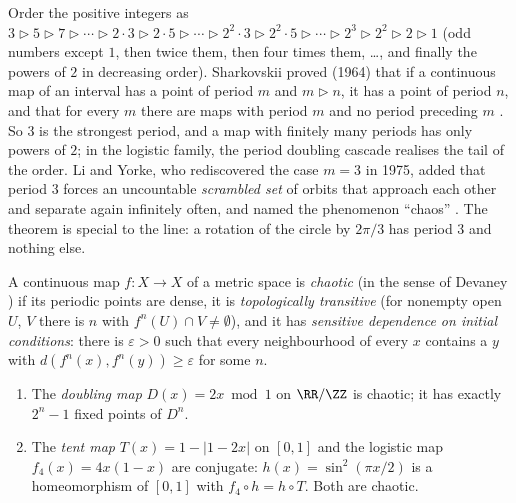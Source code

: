 \begin{remark}\label{ordinary-differential-equations:remark-sharkovskii}
Order the positive integers as $3 \rhd 5 \rhd 7 \rhd \cdots \rhd 2\cdot3 \rhd 2\cdot5 \rhd \cdots \rhd 2^2\cdot3 \rhd 2^2\cdot5 \rhd \cdots \rhd 2^3 \rhd 2^2 \rhd 2 \rhd 1$ (odd numbers except $1$, then twice them, then four times them, \ldots, and finally the
powers of $2$ in decreasing order). Sharkovskii proved (1964) that if a continuous map of an interval has a point of period $m$ and $m \rhd n$, it has a point of period $n$, and that for every $m$ there are maps with period $m$ and no
period preceding $m$ \cite{sharkovskii-1964}. So $3$ is the strongest period, and a map with finitely many periods has only powers of $2$; in the logistic family, the period doubling cascade realises the tail of the order. Li and Yorke,
who rediscovered the case $m = 3$ in 1975, added that period $3$ forces an uncountable \emph{scrambled set} of orbits that approach each other and separate again infinitely often, and named the phenomenon ``chaos''
\cite{li-yorke-1975}. The theorem is special to the line: a rotation of the circle by $2\pi/3$ has period $3$ and nothing else.
\end{remark}

\begin{definition}\label{ordinary-differential-equations:definition-chaos}
A continuous map $f \colon X \to X$ of a metric space is \emph{chaotic} (in the sense of Devaney \cite{devaney-chaos}) if its periodic points are dense, it is \emph{topologically transitive} (for nonempty open $U$, $V$ there is $n$ with
$f^n(U) \cap V \neq \emptyset$), and it has \emph{sensitive dependence on initial conditions}: there is $\varepsilon > 0$ such that every neighbourhood of every $x$ contains a $y$ with $d(f^n(x), f^n(y)) \geq \varepsilon$ for some $n$.
\end{definition}

\begin{proposition}\label{ordinary-differential-equations:proposition-tent-conjugacy}
\begin{enumerate}
\item The \emph{doubling map} $D(x) = 2x \bmod 1$ on $\RR/\ZZ$ is chaotic; it has exactly $2^n - 1$ fixed points of $D^n$.
\item The \emph{tent map} $T(x) = 1 - |1 - 2x|$ on $[0, 1]$ and the logistic map $f_4(x) = 4x(1 - x)$ are conjugate: $h(x) = \sin^2(\pi x/2)$ is a homeomorphism of $[0, 1]$ with $f_4 \circ h = h \circ T$. Both are chaotic.
\end{enumerate}
\end{proposition}

